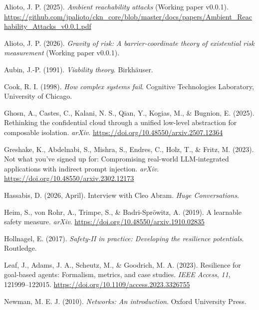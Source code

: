 \documentclass[11pt]{article}
\begin{document}
\sloppy
\begin{description}[leftmargin=1.5em, labelindent=0em, itemsep=0.4em]
\item Alioto, J. P. (2025). \emph{Ambient reachability attacks} (Working paper v0.0.1). \url{https://github.com/jpalioto/ckn_core/blob/master/docs/papers/Ambient_Reachability_Attacks_v0.0.1.pdf}

\item Alioto, J. P. (2026). \emph{Gravity of risk: A barrier-coordinate theory of existential risk measurement} (Working paper v0.0.1).

\item Aubin, J.-P. (1991). \emph{Viability theory}. Birkh\"auser.

\item Cook, R. I. (1998). \emph{How complex systems fail}. Cognitive Technologies Laboratory, University of Chicago.

\item Ghosn, A., Castes, C., Kalani, N. S., Qian, Y., Kogias, M., \& Bugnion, E. (2025). Rethinking the confidential cloud through a unified low-level abstraction for composable isolation. \emph{arXiv}. \url{https://doi.org/10.48550/arxiv.2507.12364}

\item Greshake, K., Abdelnabi, S., Mishra, S., Endres, C., Holz, T., \& Fritz, M. (2023). Not what you've signed up for: Compromising real-world LLM-integrated applications with indirect prompt injection. \emph{arXiv}. \url{https://doi.org/10.48550/arxiv.2302.12173}

\item Hassabis, D. (2026, April). Interview with Cleo Abram. \emph{Huge Conversations}.

\item Heim, S., von Rohr, A., Trimpe, S., \& Badri-Spr\"owitz, A. (2019). A learnable safety measure. \emph{arXiv}. \url{https://doi.org/10.48550/arxiv.1910.02835}

\item Hollnagel, E. (2017). \emph{Safety-II in practice: Developing the resilience potentials}. Routledge.

\item Leaf, J., Adams, J. A., Scheutz, M., \& Goodrich, M. A. (2023). Resilience for goal-based agents: Formalism, metrics, and case studies. \emph{IEEE Access}, \emph{11}, 121999--122015. \url{https://doi.org/10.1109/access.2023.3326755}

\item Newman, M. E. J. (2010). \emph{Networks: An introduction}. Oxford University Press.


\end{description}
\end{document}
